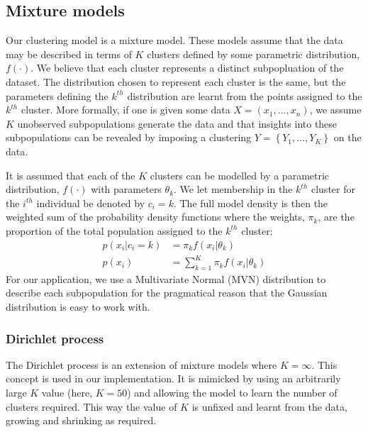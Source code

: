\documentclass[12pt]{article} %
\begin{document}
	\subsection{Mixture models} \label{mixture_models}
	Our clustering model is a mixture model. These models assume that the data may be described in terms of $K$ clusters defined by some parametric distribution, $f(\cdot)$. We believe that each cluster represents a distinct subpopluation of the dataset. The distribution chosen to represent each cluster is the same, but the parameters defining the $k^{th}$ distribution are learnt from the points assigned to the $k^{th}$ cluster. More formally, if one is given some data $X = (x_1, \ldots, x_n)$, we assume $K$ unobserved subpopulations generate the data and that insights into these subpopulations can be revealed by imposing a clustering $Y = \left\{Y_1,\ldots,Y_K\right\}$ on the data.
	
	It is assumed that each of the $K$ clusters can be modelled by a parametric distribution, $f(\cdot)$ with parameters $\theta_k$. We let membership in the $k^{th}$ cluster for the $i^{th}$ individual be denoted by $c_i = k$. The full model density is then the weighted sum of the probability density functions where the weights, $\pi_k$, are the proportion of the total population assigned to the $k^{th}$ cluster:
	\begin{align}
	p(x_i|c_i = k) &= \pi_k f(x_i | \theta_k) \\
	p(x_i) &= \sum_{k=1}^K \pi_k f(x_i | \theta_k)
	\end{align}
	For our application, we use a Multivariate Normal (MVN) distribution to describe each subpopulation for the pragmatical reason that the Gaussian distribution is easy to work with.
	

	\subsubsection{Dirichlet process}
	The Dirichlet process is an extension of mixture models where $K = \infty$. This concept is used in our implementation. It is mimicked by using an arbitrarily large $K$ value (here, $K=50$) and allowing the model to learn the number of clusters required. This way the value of $K$ is unfixed and learnt from the data, growing and shrinking as required.
	
\end{document}
